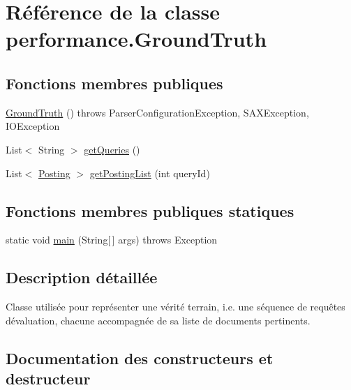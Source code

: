 \hypertarget{classperformance_1_1GroundTruth}{}\section{Référence de la classe performance.\+Ground\+Truth}
\label{classperformance_1_1GroundTruth}
\subsection*{Fonctions membres publiques}
\begin{DoxyCompactItemize}
\item 
\hyperlink{classperformance_1_1GroundTruth_a252664255620a45da73c1346116e03b7}{Ground\+Truth} ()  throws Parser\+Configuration\+Exception, S\+A\+X\+Exception, I\+O\+Exception 	
\item 
List$<$ String $>$ \hyperlink{classperformance_1_1GroundTruth_ac20e5c5f3051088a957b5dd516bbf9c5}{get\+Queries} ()
\item 
List$<$ \hyperlink{classindexation_1_1content_1_1Posting}{Posting} $>$ \hyperlink{classperformance_1_1GroundTruth_aa82e45150e7c33fd11aaccba56f0f1ed}{get\+Posting\+List} (int query\+Id)
\end{DoxyCompactItemize}
\subsection*{Fonctions membres publiques statiques}
\begin{DoxyCompactItemize}
\item 
static void \hyperlink{classperformance_1_1GroundTruth_a5708e978b3a80a3c512ca00bfaca37da}{main} (String\mbox{[}$\,$\mbox{]} args)  throws Exception  	
\end{DoxyCompactItemize}


\subsection{Description détaillée}
Classe utilisée pour représenter une vérité terrain, i.\+e. une séquence de requêtes d\textquotesingle{}évaluation, chacune accompagnée de sa liste de documents pertinents. 

\subsection{Documentation des constructeurs et destructeur}
\mbox{\label{classperformance_1_1GroundTruth_a252664255620a45da73c1346116e03b7}} 
